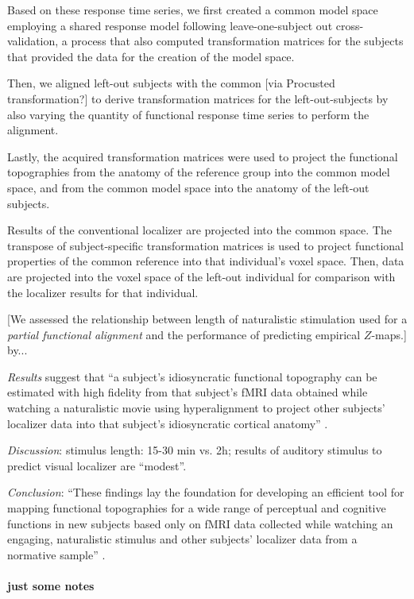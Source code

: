 Based on these response time series, we first created a common model space
employing a shared response model \citep{chen2015reduced} following
leave-one-subject out cross-validation, a process that also computed
transformation matrices for the subjects that provided the data for the creation
of the model space.

Then, we aligned left-out subjects with the common [via Procusted
transformation?] to derive transformation matrices for the left-out-subjects by
also varying the quantity of functional response time series to perform the
alignment.

Lastly, the acquired transformation matrices were used to project the functional
topographies from the anatomy of the reference group into the common model
space, and from the common model space into the anatomy of the left-out
subjects.

%
Results of the conventional localizer are projected into the common space.
%
The transpose of subject-specific transformation matrices is used to project
functional properties of the common reference into that individual's voxel
space.
%
Then, data are projected into the voxel space of the left-out individual for
comparison with the localizer results for that individual.


[We assessed the relationship between length of naturalistic stimulation used
for a \textit{partial functional alignment} and the performance of predicting
empirical $Z$-maps.] by...

%
\textit{Results} suggest that ``a subject's idiosyncratic functional topography
can be estimated with high fidelity from that subject's fMRI data obtained while
watching a naturalistic movie using hyperalignment to project other subjects’
localizer data into that subject's idiosyncratic cortical anatomy''
\citep{jiahui2020predicting}.

%
\textit{Discussion}: stimulus length: 15-30 min vs. 2h;  results of auditory
stimulus to predict visual localizer are ``modest''.

%
\textit{Conclusion}: ``These findings lay the foundation for developing an
efficient tool for mapping functional topographies for a wide range of
perceptual and cognitive functions in new subjects based only on fMRI data
collected while watching an engaging, naturalistic stimulus and other subjects'
localizer data from a normative sample'' \citep{jiahui2020predicting}.


\paragraph{just some notes}

